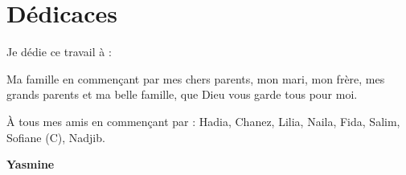 \chapter*{Dédicaces} %

Je dédie ce travail à :

Ma famille en commençant par mes chers parents, mon mari, mon frère, mes grands parents et ma belle famille, que Dieu vous garde tous pour moi.

À tous mes amis en commençant par : Hadia, Chanez, Lilia, Naila, Fida, Salim, Sofiane (C), Nadjib.
 \\

\vspace{0.5cm}
\begin{center}
\Large
\hspace{12.5cm}
\textbf{Yasmine}
\end{center}
